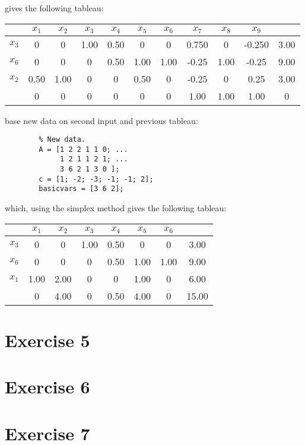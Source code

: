 \documentclass{article}
\begin{document}
    gives the following tableau:

        \begin{center}
            \begin{tabular}{ | c | c c c c c c c c c | c | }
                \hline
                       & $x_1$ & $x_2$ & $x_3$ & $x_4$ & $x_5$ & $x_6$ & $x_7$ & $x_8$ & $x_9$ &\\
                \hline
                  $x_3$ & 0& 0& 1.00& 0.50& 0& 0& 0.750& 0& -0.250& 3.00\\
                  $x_6$ & 0& 0& 0& 0.50& 1.00& 1.00& -0.25& 1.00& -0.25 & 9.00\\
                  $x_2$ & 0.50& 1.00& 0& 0& 0.50& 0& -0.25 & 0& 0.25 & 3.00\\
                \hline
                       & 0& 0& 0& 0& 0& 0& 1.00& 1.00& 1.00& 0 \\
                \hline
            \end{tabular}
        \end{center}

    base new data on second input and previous tableau:

    \begin{lstlisting}
        % New data.
        A = [1 2 2 1 1 0; ...
             1 2 1 1 2 1; ...
             3 6 2 1 3 0 ];
        c = [1; -2; -3; -1; -1; 2];
        basicvars = [3 6 2];
    \end{lstlisting}

    which, using the simplex method gives the following tableau:

    \begin{center}
        \begin{tabular}{ | c | c c c c c c | c | }
            \hline
                          & $x_1$ & $x_2$ & $x_3$ & $x_4$ & $x_5$ & $x_6$ &\\
            \hline
                   $x_3$  & 0& 0& 1.00& 0.50& 0& 0& 3.00 \\
                   $x_6$  & 0& 0& 0& 0.50& 1.00& 1.00& 9.00 \\
                   $x_1$  & 1.00& 2.00& 0& 0& 1.00& 0& 6.00 \\
            \hline
                          & 0& 4.00& 0& 0.50& 4.00& 0& 15.00 \\
            \hline
        \end{tabular}
    \end{center}

\section*{Exercise 5}
\section*{Exercise 6}
\section*{Exercise 7}
\end{document}
